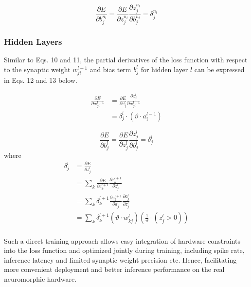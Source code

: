 \documentclass[conference]{IEEEtran}
\begin{document}
\begin{equation}
\frac{{\partial E}}{{\partial b_j^{{n_l}}}} = \frac{{\partial E}}{{\partial z_j^{{n_l}}}}\frac{{\partial z_j^{{n_l}}}}{{\partial b_j^{{n_l}}}} = \delta _j^{{n_l}}
\end{equation}

\subsubsection{Hidden Layers}
Similar to Eqs. 10 and 11, the partial derivatives of the loss function with respect to the synaptic weight $w_{ji}^{l-1}$ and bias term ${b_j^l}$ for hidden layer $l$ can be expressed in Eqs. 12 and 13 below.

\begin{equation}
\begin{aligned}
\frac{{\partial E}}{{\partial w_{ji}^{l-1}}} &= \frac{{\partial E}}{{\partial z_j^{l}}}\frac{{\partial z_j^{l}}}{{\partial w_{ji}^{l-1}}}\\
&= \delta _j^{l} \cdot \left({\vartheta  \cdot a_i^{l-1}} \right)
\end{aligned}
\end{equation}

\begin{equation}
\frac{{\partial E}}{{\partial b_j^l}} = \frac{{\partial E}}{{\partial z_j^l}}\frac{{\partial z_j^l}}{{\partial b_j^l}} = \delta _j^l
\end{equation}
where
\begin{equation}
\begin{aligned}
\delta _j^l &= \frac{{\partial E}}{{\partial z_j^l}}\\
& = \sum\nolimits_k {\frac{{\partial E}}{{\partial z_k^{l + 1}}}} \frac{{\partial z_k^{l + 1}}}{{\partial z_j^l}}\\
& = \sum\nolimits_k {\delta _k^{l + 1}} \frac{{\partial z_k^{l + 1}}}{{\partial a_j^l}}\frac{{\partial a_j^l}}{{\partial z_j^l}}\\
& = \sum\nolimits_k {\delta _k^{l + 1}} \left( {\vartheta  \cdot w_{kj}^l} \right)\left( {\frac{1}{{\vartheta}} \cdot \left( {z_j^l > 0} \right)} \right)\\
\end{aligned}
\end{equation}

Such a direct training approach allows easy integration of hardware constraints into the loss function and optimized jointly during training, including spike rate, inference latency and limited synaptic weight precision etc. Hence, facilitating more convenient deployment and better inference performance on the real neuromorphic hardware.
\end{document}
